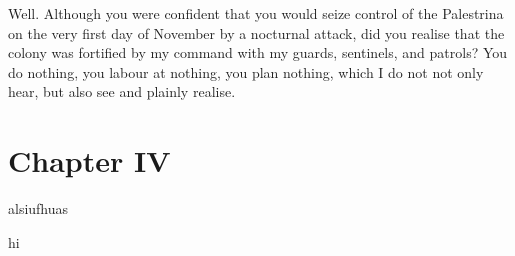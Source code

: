 \documentclass[a4paper]{article}
\begin{document}
\begin{pairs}
\begin{Rightside}
    \pend
    \pstart
    Well. Although you were confident that you would seize control of the Palestrina on the very first day of November by a nocturnal attack, did you realise that the colony was fortified by my command with my guards, sentinels, and patrols? You do nothing, you labour at nothing, you plan nothing, which I do not not only hear, but also see and plainly realise.
    \pend
    \endnumbering
  \end{Rightside}
\end{pairs}
\Columns
\newpage

\section{Chapter IV}
\begin{pairs}
  \begin{Leftside}
    \beginnumbering
    \pstart
    alsiufhuas
    \pend
    \endnumbering
  \end{Leftside}
  \begin{Rightside}
    \beginnumbering
    \pstart
    hi
    \pend
    \endnumbering
  \end{Rightside}
\end{pairs}
\Columns
\end{document}

